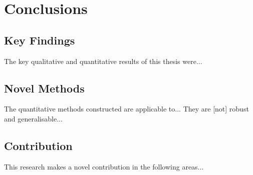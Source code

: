 \chapter{Conclusions}
\label{ch:conclusion}


\section{Key Findings}
The key qualitative and quantitative results of this thesis were...



\section{Novel Methods}
The quantitative methods constructed are applicable to...
They are [not] robust and generalisable...



\section{Contribution}
This research makes a novel contribution in the following areas...



